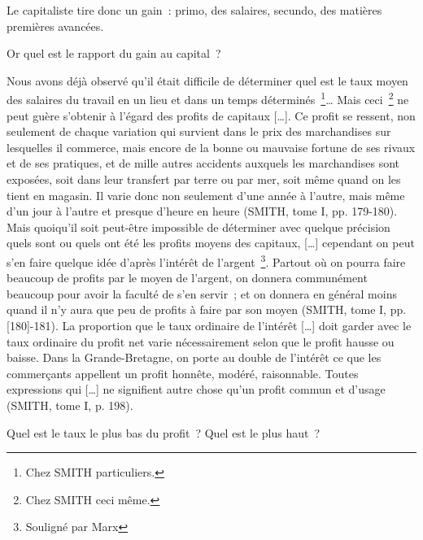 \documentclass[french,twoside]{book} %
\newenvironment{quoteblock}%
  {\begin{quoting}}
  {\end{quoting}}
\newenvironment{quotebar}{%
    \def\FrameCommand{{\color{rubric!10!}\vrule width 0.5em} \hspace{0.9em}}%
    \def\OuterFrameSep{\itemsep} %
    \MakeFramed {\advance\hsize-\width \FrameRestore}
  }%
  {%
    \endMakeFramed
  }
\renewenvironment{quoteblock}%
  {%
    \savenotes
    \setstretch{0.9}
    \normalfont
    \begin{quotebar}
  }
  {%
    \end{quotebar}
    \spewnotes
  }
\begin{document}
\noindent Le capitaliste tire donc un gain : primo, des salaires, secundo, des matières premières avancées.\par
Or quel est le rapport du gain au capital ?\par

\begin{quoteblock}
 \noindent Nous avons déjà observé qu’il était difficile de déterminer quel est le taux moyen des salaires du travail en un lieu et dans un temps déterminés \footnote{Chez SMITH particuliers.}… Mais ceci \footnote{Chez SMITH ceci même.} ne peut guère s’obtenir à l’égard des profits de capitaux […]. Ce profit se ressent, non seulement de chaque variation qui survient dans le prix des marchandises sur lesquelles il commerce, mais encore de la bonne ou mauvaise fortune de ses rivaux et de ses pratiques, et de mille autres accidents auxquels les marchandises sont exposées, soit dans leur transfert par terre ou par mer, soit même quand on les tient en magasin. Il varie donc non seulement d’une année à l’autre, mais même d’un jour à l’autre et presque d’heure en heure (SMITH, tome I, pp. 179-180). Mais quoiqu’il soit peut-être impossible de déterminer avec quelque précision quels sont ou quels ont été les profits moyens des capitaux, […] cependant on peut s’en faire quelque idée d’après l’intérêt de l’argent \footnote{Souligné par Marx}. Partout où on pourra faire beaucoup de profits par le moyen de l’argent, on donnera communément beaucoup pour avoir la faculté de s’en servir ; et on donnera en général moins quand il n’y aura que peu de profits à faire par son moyen (SMITH, tome I, pp. [180]-181). La proportion que le taux ordinaire de l’intérêt […] doit garder avec le taux ordinaire du profit net varie nécessairement selon que le profit hausse ou baisse. Dans la Grande-Bretagne, on porte au double de l’intérêt ce que les commerçants appellent un profit honnête, modéré, raisonnable. Toutes expressions qui […] ne signifient autre chose qu’un profit commun et d’usage (SMITH, tome I, p. 198).
 \end{quoteblock}

\noindent Quel est le taux le plus bas du profit ? Quel est le plus haut ?\par
\end{document}
